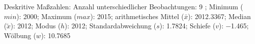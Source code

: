 				\label{tableValues:mres052b}
				\vspace*{-\baselineskip}
                    \begin{noten}
                	    \note{} Deskritive Maßzahlen:
                	    Anzahl unterschiedlicher Beobachtungen: 9%
                	    ; 
                	      Minimum ($min$): 2000; 
                	      Maximum ($max$): 2015; 
                	      arithmetisches Mittel ($\bar{x}$): \num[round-mode=places,round-precision=2]{2012,3367}; 
                	      Median ($\tilde{x}$): 2012; 
                	      Modus ($h$): 2012; 
                	      Standardabweichung ($s$): \num[round-mode=places,round-precision=2]{1,7824}; 
                	      Schiefe ($v$): \num[round-mode=places,round-precision=2]{-1,465}; 
                	      Wölbung ($w$): \num[round-mode=places,round-precision=2]{10,7685}
                     \end{noten}


